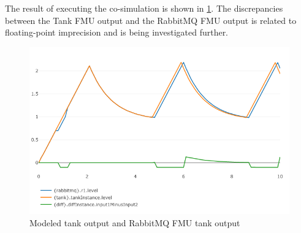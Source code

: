 The result of executing the co-simulation is shown in \cref{fig:modelled-tank-vs-rabbitmq-fmu-tank}. The discrepancies
between the Tank FMU output and the RabbitMQ FMU output is related to
floating-point imprecision and is being investigated further.
\begin{figure}[!htb]
  \centering
  \includegraphics[width=\textwidth]{figures/lfmqtt.png}
  \caption{Modeled tank output and RabbitMQ FMU tank output}
  \label{fig:modelled-tank-vs-rabbitmq-fmu-tank}
\end{figure}





